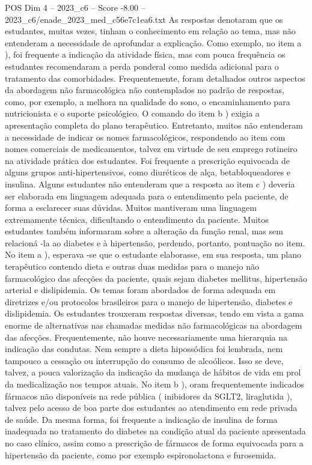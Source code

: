 \begin{textsample}{POS Dim 4 – 2023\_c6 – Score -8.00 – 2023\_c6/enade\_2023\_med\_c56e7c1ea6.txt}
As respostas denotaram que os estudantes, muitas vezes, tinham o conhecimento em relação ao tema, mas não entenderam a necessidade de aprofundar a explicação.
Como exemplo, no item a ), foi frequente a indicação da atividade física, mas com pouca frequência os estudantes recomendaram a perda ponderal como medida adicional para o tratamento das comorbidades.
Frequentemente, foram detalhados outros aspectos da abordagem não farmacológica não contemplados no padrão de respostas, como, por exemplo, a melhora na qualidade do sono, o encaminhamento para nutricionista e o suporte psicológico.
O comando do item b ) exigia a apresentação completa do plano terapêutico.
Entretanto, muitos não entenderam a necessidade de indicar os nomes farmacológicos, respondendo ao item com nomes comerciais de medicamentos, talvez em virtude de seu emprego rotineiro na atividade prática dos estudantes.
Foi frequente a prescrição equivocada de alguns grupos anti-hipertensivos, como diuréticos de alça, betabloqueadores e insulina.
Alguns estudantes não entenderam que a resposta ao item c ) deveria ser elaborada em linguagem adequada para o entendimento pela paciente, de forma a esclarecer suas dúvidas.
Muitos mantiveram uma linguagem extremamente técnica, dificultando o entendimento da paciente.
Muitos estudantes também informaram sobre a alteração da função renal, mas sem relacioná -la ao diabetes e à hipertensão, perdendo, portanto, pontuação no item.
No item a ), esperava -se que o estudante elaborasse, em sua resposta, um plano terapêutico contendo dieta e outras duas medidas para o manejo não farmacológico das afecções da paciente, quais sejam diabetes mellitus, hipertensão arterial e dislipidemia.
Os temas foram abordados de forma adequada em diretrizes e/ou protocolos brasileiros para o manejo de hipertensão, diabetes e dislipidemia.
Os estudantes trouxeram respostas diversas, tendo em vista a gama enorme de alternativas nas chamadas medidas não farmacológicas na abordagem das afecções.
Frequentemente, não houve necessariamente uma hierarquia na indicação das condutas.
Nem sempre a dieta hipossódica foi lembrada, nem tampouco a cessação ou interrupção do consumo de alcoólicos.
Isso se deve, talvez, a pouca valorização da indicação da mudança de hábitos de vida em prol da medicalização nos tempos atuais.
No item b ), oram frequentemente indicados fármacos não disponíveis na rede pública ( inibidores da SGLT2, liraglutida ), talvez pelo acesso de boa parte dos estudantes ao atendimento em rede privada de saúde.
Da mesma forma, foi frequente a indicação de insulina de forma inadequada no tratamento do diabetes na condição atual da paciente apresentada no caso clínico, assim como a prescrição de fármacos de forma equivocada para a hipertensão da paciente, como por exemplo espironolactona e furosemida.

\end{textsample}
